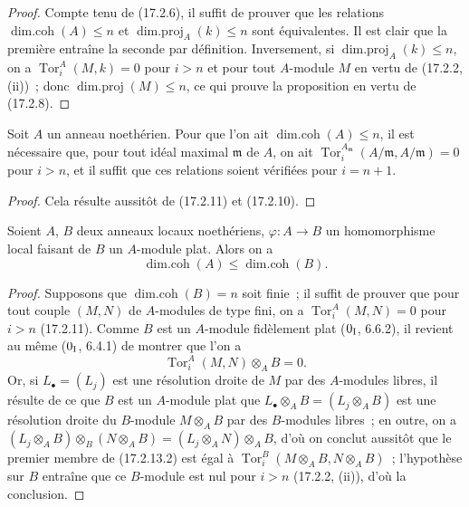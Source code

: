 \begin{proof}
Compte tenu de (17.2.6), il suffit de prouver que les relations
$\operatorname{dim.coh}(A)\leq n$ et
$\operatorname{dim.proj}_A(k)\leq n$ sont équivalentes. Il est clair que la
première entraîne la seconde par définition. Inversement, si
$\operatorname{dim.proj}_A(k)\leq n$, on a
$\operatorname{Tor}^A_i(M,k)=0$ pour $i>n$ et pour tout $A$-module $M$ en
vertu de (17.2.2, (ii))~; donc $\operatorname{dim.proj}(M)\leq n$, ce qui
prouve la proposition en vertu de (17.2.8).
\end{proof}

\begin{corollary}[17.2.12]
\label{0.17.2.12-fr}
Soit $A$ un anneau noethérien. Pour que l'on ait
$\operatorname{dim.coh}(A)\leq n$, il est nécessaire que, pour tout idéal
maximal $\mathfrak{m}$ de $A$, on ait
$\operatorname{Tor}^{A_{\mathfrak{m}}}_i(A/\mathfrak{m},A/\mathfrak{m})=0$
pour $i>n$, et il suffit que ces relations soient vérifiées pour $i=n+1$.
\end{corollary}

\begin{proof}
Cela résulte aussitôt de (17.2.11) et (17.2.10).
\end{proof}

\begin{proposition}[17.2.13]
\label{0.17.2.13-fr}
Soient $A$, $B$ deux anneaux locaux noethériens,
$\varphi:A\longrightarrow B$ un homomorphisme local faisant de $B$ un
$A$-module plat. Alors on a
\begin{equation}
\label{0.17.2.13.1-fr}
\tag{17.2.13.1}
  \operatorname{dim.coh}(A)\leq\operatorname{dim.coh}(B).
\end{equation}
\end{proposition}

\begin{proof}
Supposons que $\operatorname{dim.coh}(B)=n$ soit finie~; il suffit de prouver
que pour tout couple $(M,N)$ de $A$-modules de type fini, on a
$\operatorname{Tor}^A_i(M,N)=0$ pour $i>n$ (17.2.11). Comme $B$ est un
$A$-module fidèlement plat ($0_{\rm I}$, 6.6.2), il revient au même
($0_{\rm I}$, 6.4.1) de montrer que l'on a
\begin{equation}
\label{0.17.2.13.2-fr}
\tag{17.2.13.2}
  \operatorname{Tor}^A_i(M,N)\otimes_A B=0.
\end{equation}
Or, si $L_\bullet=(L_j)$ est une résolution droite de $M$ par des $A$-modules
libres, il résulte de ce que $B$ est un $A$-module plat que
$L_\bullet\otimes_A B=(L_j\otimes_A B)$ est une résolution droite du
$B$-module $M\otimes_A B$ par des $B$-modules libres~; en outre, on a
$(L_j\otimes_A B)\otimes_B(N\otimes_A B)
=(L_j\otimes_A N)\otimes_A B$, d'où on conclut aussitôt que le premier membre
de (17.2.13.2) est égal à
$\operatorname{Tor}^B_i(M\otimes_A B,N\otimes_A B)$~; l'hypothèse sur $B$
entraîne que ce $B$-module est nul pour $i>n$ (17.2.2, (ii)), d'où la
conclusion.
\end{proof}

